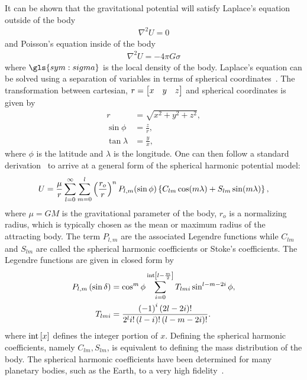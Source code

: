 It can be shown that the gravitational potential will satisfy Laplace's equation outside of the body
\begin{align}\label{eq:laplace_equation}
    \nabla^2 U = 0
\end{align}
and Poisson's equation inside of the body
\begin{align}\label{eq:poisson_equation}
    \nabla^2 U = - 4 \pi G \sigma
\end{align}
where \( \gls{sym:sigma} \) is the local density of the body.
Laplace's equation can be solved using a separation of variables in terms of spherical coordinates~\cite{scheeres2012a}.
The transformation between cartesian, \( r = \begin{bmatrix} x & y & z \end{bmatrix}\) and spherical coordinates is given by
\begin{subequations}
    \begin{align*}
        r &= \sqrt{x^2 + y^2 + z^2}, \\
        \sin \phi &= \frac{z}{r}, \\
        \tan \lambda &= \frac{y}{x},
    \end{align*}
\end{subequations}
where \( \phi \) is the latitude and \( \lambda\) is the longitude.
One can then follow a standard derivation~\cite{vallado2007} to arrive at a general form of the spherical harmonic potential model:
\begin{align}\label{eq:spherical_harmonic}
    U = \frac{\mu}{r} \sum_{l=0}^\infty \sum_{m=0}^l \left( \frac{r_o}{r} \right)^n P_{l, m}(\sin \phi) \left\{  C_{lm} \cos(m \lambda) + S_{lm} \sin(m \lambda) \right\},
\end{align}
where \( \mu = G M \) is the gravitational parameter of the body, \( r_o\) is a normalizing radius, which is typically chosen as the mean or maximum radius of the attracting body.
The term \( P_{l, m} \) are the associated Legendre functions while \( C_{lm}\) and \( S_{lm}\) are called the spherical harmonic coefficients or Stoke's coefficients. 
The Legendre functions are given in closed form by~\cite{scheeres2012}
\begin{subequations}
\begin{align}
    P_{l, m} \left(  \sin \delta \right) &= \cos^m \phi \sum_{i = 0}^{\text{int}\left[ l - \frac{m}{2} \right]} T_{lmi} \sin^{l - m - 2i} \phi ,  \\
T_{lmi} &= \frac{\left( -1 \right)^i\left( 2l - 2i \right)!}{2^l i! \left( l - i \right)!\left( l - m- 2i \right)!}.
\end{align}
\end{subequations}
where \( \text{int}\left[ x \right]\) defines the integer portion of \( x \).
Defining the spherical harmonic coefficients, namely \( C_{lm}, S_{lm}\), is equivalent to defining the mass distribution of the body.
The spherical harmonic coefficients have been determined for many planetary bodies, such as the Earth, to a very high fidelity~\cite{vallado2007,pavlis2012}.

